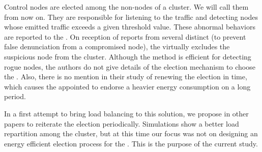 Control nodes are elected among the non-\ch nodes of a cluster.
We will call them \cns from now on.
They are responsible for listening to the traffic and detecting nodes whose emitted traffic exceeds a given threshold value.
These abnormal behaviors are reported to the \ch.
On reception of reports from several distinct \cns (to prevent false denunciation from a compromised node), the \CH virtually excludes the suspicious node from the cluster.
Although the method is efficient for detecting rogue nodes, the authors do not give details of the election mechanism to choose the \cns.
Also, there is no mention in their study of renewing the election in time, which causes the appointed \cns to endorse a heavier energy consumption on a long period.

In a first attempt to bring load balancing to this solution, we propose in other papers\cite{GMT12,BMM13} to reiterate the election periodically.
Simulations show a better load repartition among the cluster, but at this time our focus was not on designing an energy efficient election process for the \cns.
This is the purpose of the current study.
